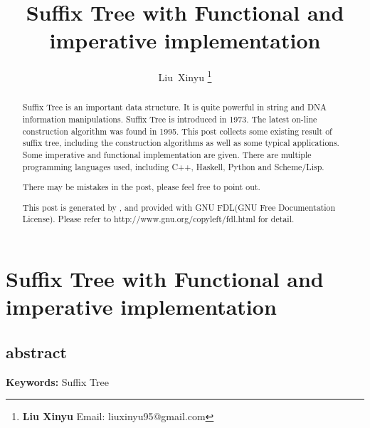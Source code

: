 \documentclass{article}
\begin{document}
\fi


\title{Suffix Tree with Functional and imperative implementation}

\author{Liu~Xinyu
\thanks{{\bfseries Liu Xinyu } \newline
  Email: liuxinyu95@gmail.com \newline}
  }


\maketitle

\ifx\wholebook\relax
\chapter{Suffix Tree with Functional and imperative implementation}

\section{abstract}
\else
\begin{abstract}
\fi
Suffix Tree is an important data structure. It is quite powerful in 
string and DNA information manipulations. Suffix Tree is introduced in 1973.
The latest on-line construction algorithm was found in 1995. This post 
collects some existing result of suffix tree, including the construction
algorithms as well as some typical applications. Some imperative and functional
implementation are given. There are multiple programming languages used, 
including C++, Haskell, Python and Scheme/Lisp.

There may be mistakes in the post, please feel free to point out.

This post is generated by \LaTeXe, and provided with GNU FDL(GNU Free Documentation License).
Please refer to http://www.gnu.org/copyleft/fdl.html for detail.

\ifx\wholebook\relax \else
\end{abstract}
\fi

\vspace{3cm}
{\bfseries Keywords:} Suffix Tree
\end{document}
